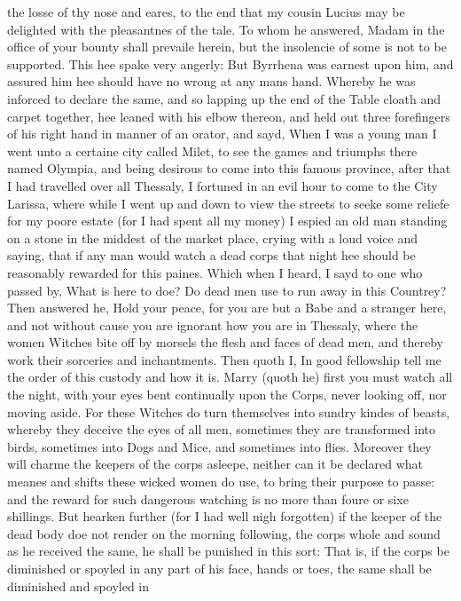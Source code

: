 the losse of thy nose and eares, to the end that my cousin Lucius may be
delighted with the pleasantnes of the tale. To whom he answered, Madam in the
office of your bounty shall prevaile herein, but the insolencie of some is not
to be supported. This hee spake very angerly: But Byrrhena was earnest upon
him, and assured him hee should have no wrong at any mans hand. Whereby he was
inforced to declare the same, and so lapping up the end of the Table cloath and
carpet together, hee leaned with his elbow thereon, and held out three
forefingers of his right hand in manner of an orator, and sayd, When I was a
young man I went unto a certaine city called Milet, to see the games and
triumphs there named Olympia, and being desirous to come into this famous
province, after that I had travelled over all Thessaly, I fortuned in an evil
hour to come to the City Larissa, where while I went up and down to view the
streets to seeke some reliefe for my poore estate (for I had spent all my
money) I espied an old man standing on a stone in the middest of the market
place, crying with a loud voice and saying, that if any man would watch a dead
corps that night hee should be reasonably rewarded for this paines. Which when
I heard, I sayd to one who passed by, What is here to doe? Do dead men use to
run away in this Countrey? Then answered he, Hold your peace, for you are but a
Babe and a stranger here, and not without cause you are ignorant how you are in
Thessaly, where the women Witches bite off by morsels the flesh and faces of
dead men, and thereby work their sorceries and inchantments. Then quoth I, In
good fellowship tell me the order of this custody and how it is. Marry (quoth
he) first you must watch all the night, with your eyes bent continually upon
the Corps, never looking off, nor moving aside. For these Witches do turn
themselves into sundry kindes of beasts, whereby they deceive the eyes of all
men, sometimes they are transformed into birds, sometimes into Dogs and Mice,
and sometimes into flies. Moreover they will charme the keepers of the corps
asleepe, neither can it be declared what meanes and shifts these wicked women
do use, to bring their purpose to passe: and the reward for such dangerous
watching is no more than foure or sixe shillings. But hearken further (for I
had well nigh forgotten) if the keeper of the dead body doe not render on the
morning following, the corps whole and sound as he received the same, he shall
be punished in this sort: That is, if the corps be diminished or spoyled in any
part of his face, hands or toes, the same shall be diminished and spoyled in
